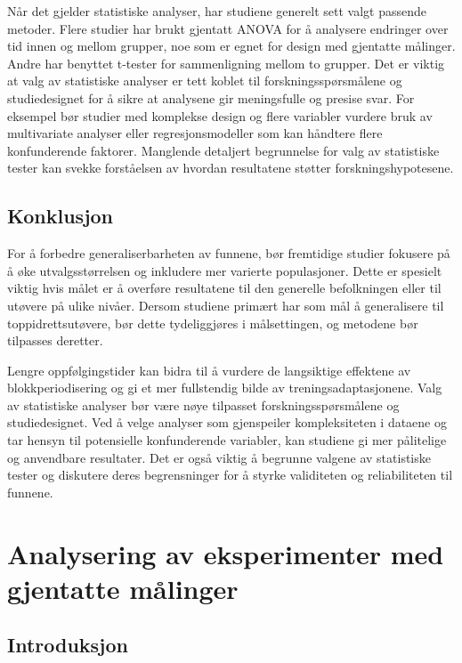 \documentclass[
  letterpaper,
  DIV=11,
  numbers=noendperiod]{scrreprt}
\begin{document}
Når det gjelder statistiske analyser, har studiene generelt sett valgt
passende metoder. Flere studier har brukt gjentatt ANOVA for å analysere
endringer over tid innen og mellom grupper, noe som er egnet for design
med gjentatte målinger. Andre har benyttet t-tester for sammenligning
mellom to grupper. Det er viktig at valg av statistiske analyser er tett
koblet til forskningsspørsmålene og studiedesignet for å sikre at
analysene gir meningsfulle og presise svar. For eksempel bør studier med
komplekse design og flere variabler vurdere bruk av multivariate
analyser eller regresjonsmodeller som kan håndtere flere konfunderende
faktorer. Manglende detaljert begrunnelse for valg av statistiske tester
kan svekke forståelsen av hvordan resultatene støtter
forskningshypotesene.

\section{Konklusjon}\label{konklusjon}

For å forbedre generaliserbarheten av funnene, bør fremtidige studier
fokusere på å øke utvalgsstørrelsen og inkludere mer varierte
populasjoner. Dette er spesielt viktig hvis målet er å overføre
resultatene til den generelle befolkningen eller til utøvere på ulike
nivåer. Dersom studiene primært har som mål å generalisere til
toppidrettsutøvere, bør dette tydeliggjøres i målsettingen, og metodene
bør tilpasses deretter.

Lengre oppfølgingstider kan bidra til å vurdere de langsiktige effektene
av blokkperiodisering og gi et mer fullstendig bilde av
treningsadaptasjonene. Valg av statistiske analyser bør være nøye
tilpasset forskningsspørsmålene og studiedesignet. Ved å velge analyser
som gjenspeiler kompleksiteten i dataene og tar hensyn til potensielle
konfunderende variabler, kan studiene gi mer pålitelige og anvendbare
resultater. Det er også viktig å begrunne valgene av statistiske tester
og diskutere deres begrensninger for å styrke validiteten og
reliabiliteten til funnene.


\chapter{Analysering av eksperimenter med gjentatte
målinger}\label{analysering-av-eksperimenter-med-gjentatte-muxe5linger}

\section{Introduksjon}\label{introduksjon-3}
\end{document}
